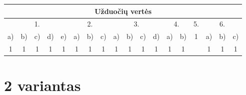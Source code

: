 \documentclass[a4paper]{article}
\begin{document}
\begin{table}[!htpb]
      \centering
      \begin{tabular}{|cccccccccccccccccc|}
            \hline
            \multicolumn{18}{|c|}{Užduočių vertės}

            \\ \hline
            \multicolumn{5}{|c|}{1.}
                                                    &
            \multicolumn{3}{c|}{2.}                 &
            \multicolumn{4}{c|}{3.}
                                                    & \multicolumn{2}{c|}{4.} &
            \multicolumn{1}{c|}{5.}                 & \multicolumn{3}{c|}{6.}
            \\ \hline
            \multicolumn{1}{|c|}{a)}                & \multicolumn{1}{c|}{b)} &
            \multicolumn{1}{c|}{c)}                 & \multicolumn{1}{c|}{d)} & \multicolumn{1}{c|}{e)} &
            \multicolumn{1}{c|}{a)}                 & \multicolumn{1}{c|}{b)} & \multicolumn{1}{c|}{c)} &
            \multicolumn{1}{c|}{a)}                 & \multicolumn{1}{c|}{b)} & \multicolumn{1}{c|}{c)} &
            \multicolumn{1}{c|}{d)}                 & \multicolumn{1}{c|}{a)} & \multicolumn{1}{c|}{b)} &
            \multicolumn{1}{c|}{\multirow{2}{*}{1}} & \multicolumn{1}{c|}{a)} &
            \multicolumn{1}{c|}{b)}                 & c)                                                  \\
            \multicolumn{1}{|c|}{1}                 & \multicolumn{1}{c|}{1}  &
            \multicolumn{1}{c|}{1}                  & \multicolumn{1}{c|}{1}  & \multicolumn{1}{c|}{1}  &
            \multicolumn{1}{c|}{1}                  & \multicolumn{1}{c|}{1}  & \multicolumn{1}{c|}{1}  &
            \multicolumn{1}{c|}{1}                  & \multicolumn{1}{c|}{1}  & \multicolumn{1}{c|}{1}  &
            \multicolumn{1}{c|}{1}                  & \multicolumn{1}{c|}{1}  & \multicolumn{1}{c|}{1}  &
            \multicolumn{1}{c|}{}                   & \multicolumn{1}{c|}{1}  &
            \multicolumn{1}{c|}{1}                  & 1                                                   \\ \hline
      \end{tabular}
\end{table}
\bigskip

\section*{2 variantas}
\end{document}
